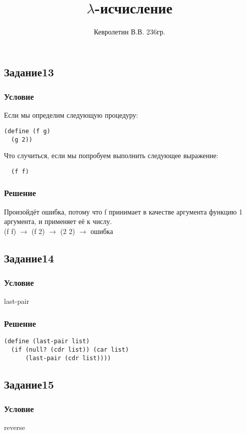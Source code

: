 \documentclass[10pt,a4paper]{article}
\author{Кевролетин В.В. 236гр.}
\title{$\lambda$-исчисление}
\begin{document}
\maketitle

\subsection*{Задание13}
\subsubsection*{Условие}
Если мы определим следующую процедуру:
\begin{lstlisting}
(define (f g)
  (g 2))
\end{lstlisting}
Что случиться, если мы попробуем выполнить следующее выражение:
\begin{lstlisting}
  (f f)
\end{lstlisting}

\subsubsection*{Решение}
Произойдёт ошибка, потому что f принимает в качестве аргумента функцию
1 аргумента, и применяет её к числу. \\
(f f) $\rightarrow $ (f 2) $\rightarrow$ (2 2) $\rightarrow$ ошибка

\subsection*{Задание14}
\subsubsection*{Условие}
last-pair
\subsubsection*{Решение}

\begin{lstlisting}
(define (last-pair list)
  (if (null? (cdr list)) (car list)
      (last-pair (cdr list))))
\end{lstlisting}

\subsection*{Задание15}
\subsubsection*{Условие}
reverse
\end{document}

